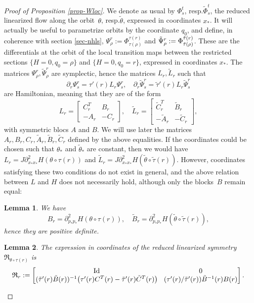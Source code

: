 \documentclass[11pt]{article}
\newcommand{\resp}{resp.\xspace}
\DeclareMathOperator{\Id}{Id}
\newcommand{\gR}{\ensuremath{\mathfrak{R}}}
\theoremstyle{plain}
\newtheorem{lem}{Lemma}
\theoremstyle{definition}
\begin{document}
\begin{proof}[Proof of Proposition \ref{prop-Wloc}]
We denote as usual by $\Phi_s^t$, \resp $\tilde \Phi_s^t$, the reduced linearized flow along the orbit~$\theta$, \resp $\tilde \theta$, expressed in coordinates $x_*$.
It will actually be useful to parametrize orbits by the coordinate $q_0$, and define, in coherence with section \ref{sec-nhls}, $\Psi_{\rho}^r:= \Phi_{\tau(\rho)}^{\tau(r)}$ and
$\tilde \Psi_{\rho}^r:=\nobreak\Phi_{\tilde \tau(\rho)}^{\tilde \tau(r)}$. These are the differentials at the orbit of the local transition maps between the restricted sections $\{H=0, q_0=\rho \}$ and $\{H=0, q_0=r \}$, expressed in coordinates $x_*$.
The matrices $\Psi_{\rho}^r, \tilde \Psi_{\rho}^r$ are symplectic, hence the matrices $L_r, \tilde L_r$ such that
\[
\partial_r \Psi_s^r=\tau'(r)L_r \Psi_s^r, \quad
\partial_r \tilde \Psi_s^r=\tilde \tau'(r)L_r \tilde \Psi_s^r
\]
are Hamiltonian, meaning that they are of the form
\[
L_r=\begin{bmatrix}
C_r^T & B_r\\-A_r &-C _r
\end{bmatrix}
, \quad
\tilde L_r=\begin{bmatrix}
\tilde C_r^T & \tilde B_r\\-\tilde A_r &-\tilde C _r
\end{bmatrix},
\]
with symmetric blocs $A$ and $B$. We will use later the matrices $A_r, B_r, C_r, \tilde A_r, \tilde B_r, \tilde C_r$ defined by the above equalities.
If the coordinates could be chosen such that $\theta_*$ and $\tilde \theta_* $ are constant, then we would have $L_r=J\partial^2_{x_*x_*}H(\theta\circ \tau(r))$ and $\tilde L_r=J\partial^2_{x_*x_*}H(\tilde \theta \circ\tilde \tau(r))$.
However, coordinates satisfying these two conditions do not exist in general, and the above relation between $L$ and $H$ does not necessarily hold,
although only the blocks~$B$ remain equal:

\begin{lem}\label{lem-reduc}
We have
\[
B_r= \partial^2_{p_*p_*}H(\theta\circ \tau(r)), \quad \tilde B_r= \partial^2_{p_*p_*}H(\tilde \theta\circ \tilde \tau(r)),
\]
hence they are positive definite.
\end{lem}

\begin{lem}\label{lem-R}
The expression in coordinates of the reduced linearized symmetry $\gR_{\theta\circ \tau(r)}$ is
\[\arraycolsep4.5pt
\gR_{r}:=
\begin{bmatrix}
\Id&0\\
(\tilde \tau'(r)\tilde B(r))^{-1}\big(\tau'(r)C^T(r)-\tilde \tau'(r) \tilde C^T(r)\big) & (\tau'(r)/\tilde \tau'(r)) \tilde B^{-1}(r) B(r)
\end{bmatrix}.
\]
\end{lem}


\end{proof}
\end{document}
